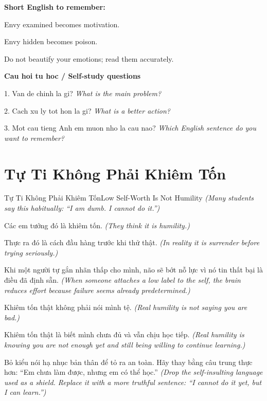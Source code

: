 \begin{ghinhoanh}
\textbf{Short English to remember:}

Envy examined becomes motivation.

Envy hidden becomes poison.

Do not beautify your emotions; read them accurately.

\end{ghinhoanh}

\begin{tuhocnhanh}
\textbf{Cau hoi tu hoc / Self-study questions}

1. Van de chinh la gi? \textit{What is the main problem?}

2. Cach xu ly tot hon la gi? \textit{What is a better action?}

3. Mot cau tieng Anh em muon nho la cau nao? \textit{Which English sentence do you want to remember?}
\end{tuhocnhanh}
\ngancach

\section{Tự Ti Không Phải Khiêm Tốn}
\begin{truyen}{Tự Ti Không Phải Khiêm Tốn}{Low Self-Worth Is Not Humility}
\textit{(Many students say this habitually: ``I am dumb. I cannot do it.'')}

Các em tưởng đó là khiêm tốn.
\textit{(They think it is humility.)}

Thực ra đó là cách đầu hàng trước khi thử thật.
\textit{(In reality it is surrender before trying seriously.)}

Khi một người tự gắn nhãn thấp cho mình, não sẽ bớt nỗ lực vì nó tin thất bại là điều đã định sẵn.
\textit{(When someone attaches a low label to the self, the brain reduces effort because failure seems already predetermined.)}

Khiêm tốn thật không phải nói mình tệ.
\textit{(Real humility is not saying you are bad.)}

Khiêm tốn thật là biết mình chưa đủ và vẫn chịu học tiếp.
\textit{(Real humility is knowing you are not enough yet and still being willing to continue learning.)}

\end{truyen}

\begin{baihoc}
Bỏ kiểu nói hạ nhục bản thân để tỏ ra an toàn. Hãy thay bằng câu trung thực hơn: ``Em chưa làm được, nhưng em có thể học.''
\textit{(Drop the self-insulting language used as a shield. Replace it with a more truthful sentence: ``I cannot do it yet, but I can learn.'')}
\end{baihoc}

